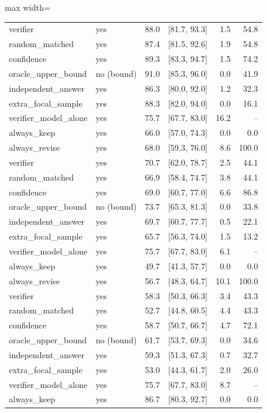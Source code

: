 \begin{table}[t]
\begin{adjustbox}{max width=\linewidth}
\begin{tabular}{@{}llrrrr@{}}
verifier & yes & 88.0 & [81.7, 93.3] & 1.5 & 54.8 \\
random\_matched & yes & 87.4 & [81.5, 92.6] & 1.9 & 54.8 \\
confidence & yes & 89.3 & [83.3, 94.7] & 1.5 & 74.2 \\
oracle\_upper\_bound & no (bound) & 91.0 & [85.3, 96.0] & 0.0 & 41.9 \\
independent\_answer & yes & 86.3 & [80.0, 92.0] & 1.2 & 32.3 \\
extra\_focal\_sample & yes & 88.3 & [82.0, 94.0] & 0.0 & 16.1 \\
verifier\_model\_alone & yes & 75.7 & [67.7, 83.0] & 16.2 & -- \\
always\_keep & yes & 66.0 & [57.0, 74.3] & 0.0 & 0.0 \\
always\_revise & yes & 68.0 & [59.3, 76.0] & 8.6 & 100.0 \\
verifier & yes & 70.7 & [62.0, 78.7] & 2.5 & 44.1 \\
random\_matched & yes & 66.9 & [58.4, 74.7] & 3.8 & 44.1 \\
confidence & yes & 69.0 & [60.7, 77.0] & 6.6 & 86.8 \\
oracle\_upper\_bound & no (bound) & 73.7 & [65.3, 81.3] & 0.0 & 33.8 \\
independent\_answer & yes & 69.7 & [60.7, 77.7] & 0.5 & 22.1 \\
extra\_focal\_sample & yes & 65.7 & [56.3, 74.0] & 1.5 & 13.2 \\
verifier\_model\_alone & yes & 75.7 & [67.7, 83.0] & 6.1 & -- \\
always\_keep & yes & 49.7 & [41.3, 57.7] & 0.0 & 0.0 \\
always\_revise & yes & 56.7 & [48.3, 64.7] & 10.1 & 100.0 \\
verifier & yes & 58.3 & [50.3, 66.3] & 3.4 & 43.3 \\
random\_matched & yes & 52.7 & [44.8, 60.5] & 4.4 & 43.3 \\
confidence & yes & 58.7 & [50.7, 66.7] & 4.7 & 72.1 \\
oracle\_upper\_bound & no (bound) & 61.7 & [53.7, 69.3] & 0.0 & 34.6 \\
independent\_answer & yes & 59.3 & [51.3, 67.3] & 0.7 & 32.7 \\
extra\_focal\_sample & yes & 53.0 & [44.3, 61.7] & 2.0 & 26.0 \\
verifier\_model\_alone & yes & 75.7 & [67.7, 83.0] & 8.7 & -- \\
always\_keep & yes & 86.7 & [80.3, 92.7] & 0.0 & 0.0 \\

\end{tabular}
\end{adjustbox}
\end{table}
